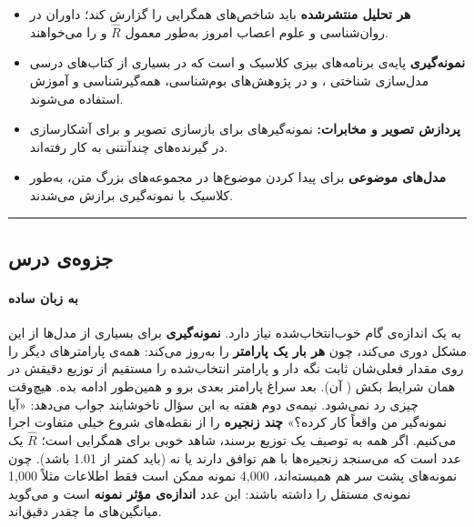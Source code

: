 \begin{itemize}
\tightlist
\item
  \textbf{هر تحلیل  منتشرشده} باید شاخص‌های همگرایی را گزارش
  کند؛ داوران در روان‌شناسی و علوم اعصاب امروز به‌طور معمول \(\hat R\) و
   را می‌خواهند.
\item
  \textbf{نمونه‌گیری } پایه‌ی برنامه‌های بیزی کلاسیک  و
   است که در بسیاری از کتاب‌های درسی مدل‌سازی شناختی  \lr{\&}
  ،  و در پژوهش‌های بوم‌شناسی، همه‌گیرشناسی و
  آموزش استفاده می‌شوند.
\item
  \textbf{پردازش تصویر و مخابرات:} نمونه‌گیرهای  برای بازسازی
  تصویر و برای آشکارسازی در گیرنده‌های چندآنتنی  به کار
  رفته‌اند.
\item
  \textbf{مدل‌های موضوعی } برای پیدا کردن موضوع‌ها در
  مجموعه‌های بزرگ متن، به‌طور کلاسیک با نمونه‌گیری  برازش می‌شدند.
\end{itemize}

\begin{center}\rule{0.5\linewidth}{0.5pt}\end{center}


\subsection{جزوه‌ی درس}

\paragraph{به زبان ساده}

 به یک اندازه‌ی گام خوب‌انتخاب‌شده نیاز دارد.
\textbf{نمونه‌گیری } برای بسیاری از مدل‌ها از این مشکل دوری
می‌کند، چون \textbf{هر بار یک پارامتر} را به‌روز می‌کند: همه‌ی پارامترهای
دیگر را روی مقدار فعلی‌شان ثابت نگه دار و پارامتر انتخاب‌شده را مستقیم از
توزیع دقیقش در همان شرایط بکش (\textbf{} آن). بعد
سراغ پارامتر بعدی برو و همین‌طور ادامه بده. هیچ‌وقت چیزی رد نمی‌شود. نیمه‌ی
دوم هفته به این سؤال ناخوشایند جواب می‌دهد: «آیا نمونه‌گیر من واقعاً کار
کرده؟» \textbf{چند زنجیره} را از نقطه‌های شروع خیلی متفاوت اجرا می‌کنیم.
اگر همه به توصیف یک توزیع برسند، شاهد خوبی برای همگرایی است؛ \(\hat R\)
 یک عدد است که می‌سنجد زنجیره‌ها با هم توافق دارند یا نه
(باید کمتر از 1.01 باشد). چون نمونه‌های پشت سر هم همبسته‌اند، 4,000 نمونه
ممکن است فقط اطلاعات مثلاً 1,000 نمونه‌ی مستقل را داشته باشند: این عدد
\textbf{اندازه‌ی مؤثر نمونه } است و می‌گوید میانگین‌های ما چقدر
دقیق‌اند.

